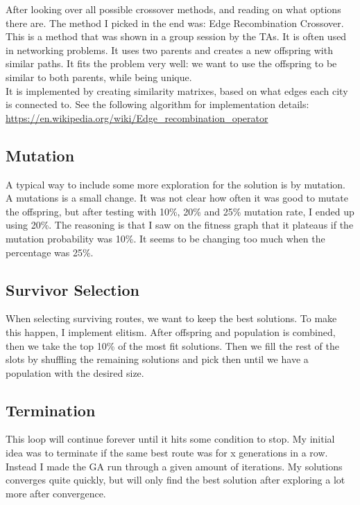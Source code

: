 \documentclass{article}
\begin{document}
    After looking over all possible crossover methods, and reading on what options there are. The method I picked in the end was: Edge Recombination Crossover. 
    This is a method that was shown in a group session by the TAs. It is often used in networking problems. It uses two parents and creates a new offspring with similar paths. 
    It fits the problem very well: we want to use the offspring to be similar to both parents, while being unique. \\

    It is implemented by creating similarity matrixes, based on what edges each city is connected to. 
    See the following algorithm for implementation details: \url{https://en.wikipedia.org/wiki/Edge_recombination_operator}
    

    \subsection{Mutation}

    A typical way to include some more exploration for the solution is by mutation. A mutations is a small change. 
    It was not clear how often it was good to mutate the offspring, but after testing with 10\%, 20\% and 25\% mutation rate, I ended up using 20\%. 
    The reasoning is that I saw on the fitness graph that it plateaus if the mutation probability was 10\%. It seems to be changing too much when the percentage was 25\%. 

    \subsection{Survivor Selection}

    When selecting surviving routes, we want to keep the best solutions. To make this happen, I implement elitism. 
    After offspring and population is combined, then we take the top 10\% of the most fit solutions. 
    Then we fill the rest of the slots by shuffling the remaining solutions and pick then until we have a population with the desired size.

    \subsection{Termination}

    This loop will continue forever until it hits some condition to stop. My initial idea was to terminate if the same best route was for x generations in a row.
    Instead I made the GA run through a given amount of iterations. My solutions converges quite quickly, but will only find the best solution after exploring a lot more after convergence. 
\end{document}
